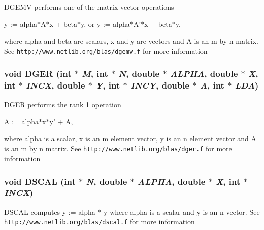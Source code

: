 DGEMV performs one of the matrix-vector operations

y := alpha$\ast$A$\ast$x + beta$\ast$y, or y := alpha$\ast$A'$\ast$x + beta$\ast$y,

where alpha and beta are scalars, x and y are vectors and A is an m by n matrix. See {\tt http://www.netlib.org/blas/dgemv.f} for more information 
\subsubsection{\setlength{\rightskip}{0pt plus 5cm}void DGER (int $\ast$ {\em M}, int $\ast$ {\em N}, double $\ast$ {\em ALPHA}, double $\ast$ {\em X}, int $\ast$ {\em INCX}, double $\ast$ {\em Y}, int $\ast$ {\em INCY}, double $\ast$ {\em A}, int $\ast$ {\em LDA})}\label{blas_8h_0e94e92e34c53a34c57b3a809d19eac6_0e94e92e34c53a34c57b3a809d19eac6}


DGER performs the rank 1 operation

A := alpha$\ast$x$\ast$y' + A,

where alpha is a scalar, x is an m element vector, y is an n element vector and A is an m by n matrix. See {\tt http://www.netlib.org/blas/dger.f} for more information 
\subsubsection{\setlength{\rightskip}{0pt plus 5cm}void DSCAL (int $\ast$ {\em N}, double $\ast$ {\em ALPHA}, double $\ast$ {\em X}, int $\ast$ {\em INCX})}\label{blas_8h_6ada9a0fa85bc5cc675ebb052fcfebd0_6ada9a0fa85bc5cc675ebb052fcfebd0}


DSCAL computes y := alpha $\ast$ y where alpha is a scalar and y is an n-vector. See {\tt http://www.netlib.org/blas/dscal.f} for more information 